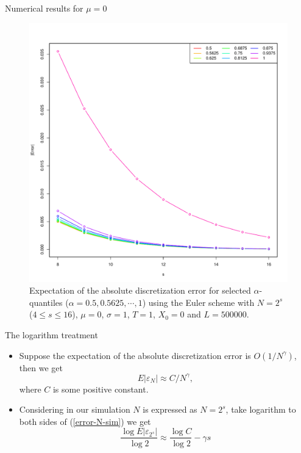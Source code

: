 \documentclass[cjk,10pt]{beamer}
\begin{document}
\begin{frame}{Numerical results for $\mu=0$}
\begin{figure}
   \includegraphics[scale=0.3]{nout_0a.pdf}
   \caption{Expectation of the absolute discretization error for selected $\alpha$-quantiles ($\alpha = 0.5, 0.5625, \cdots, 1$) using the Euler scheme with $N = 2^s$ ($4\le s \le 16$), $\mu=0$, $\sigma=1$, $T=1$, $X_0=0$ and $L=500000$. }
\label{f:ab}
\end{figure}
\end{frame}

\begin{frame}{The logarithm treatment}
\begin{itemize}
\item
Suppose the expectation of the absolute discretization error is $O(1/N^\gamma)$, then we get
\begin{equation}\label{error-N-sim}
E|\varepsilon_N| \approx C/N^\gamma,
\end{equation}
where $C$ is some positive constant. 
\item
Considering in our simulation $N$ is expressed as $N = 2^s$, take logarithm to both sides of (\ref{error-N-sim}) we get
\begin{equation}
\frac{\log E|\varepsilon_{2^s}|}{\log 2} \approx \frac{\log C}{\log 2} -\gamma s
\end{equation}
\end{itemize}
\end{frame}
\end{document}
